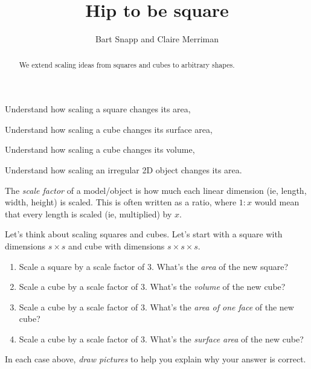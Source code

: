 \documentclass[handout,nooutcomes,noauthor,hints]{ximera}
\title{Hip to be square}
\author{Bart Snapp and Claire Merriman}
\begin{document}
\begin{abstract}
  We extend scaling ideas from squares and cubes to arbitrary shapes.
\end{abstract}
\maketitle

\begin{listOutcomes}
\item Understand how scaling a square changes its area,
\item Understand how scaling a cube changes its surface area,
\item Understand how scaling a cube changes its volume,
\item Understand how scaling an irregular 2D object changes its area.
\end{listOutcomes}



\begin{definition}
 The \emph{scale factor} of a model/object is how much each linear dimension (ie, length, width, height) is scaled. This is often written as a ratio, where $1:x$ would mean that every length is scaled (ie, multiplied) by $x$. \end{definition}

\mynewpage

\begin{question}
  Let's think about scaling squares and cubes. Let's start with a
  square with dimensions $s\times s$ and cube with dimensions $s\times
  s\times s$.
  \begin{enumerate}
  \item Scale a square by a scale factor of $3$. What's the \emph{area} of the new square? 
  \item Scale a cube by a scale factor of $3$. What's the \emph{volume} of the new cube?
  \item Scale a cube by a scale factor of $3$. What's the \emph{area of one face} of the new cube?
  \item Scale a cube by a scale factor of $3$. What's the \emph{surface area} of the new cube?
  \end{enumerate}
  In each case above, \emph{draw pictures} to help you explain why
  your answer is correct.
\end{question}
\mynewpage
\end{document}
